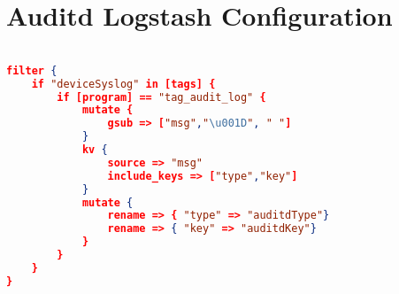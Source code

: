 
%
%

\section*{Auditd Logstash Configuration}
%
\label{appendix:auditdlogstashconfiguration}

\begin{lstlisting}[language=json,firstnumber=1]

filter {
    if "deviceSyslog" in [tags] {
        if [program] == "tag_audit_log" { 
            mutate {
                gsub => ["msg","\u001D", " "]
            }
            kv {
                source => "msg"
                include_keys => ["type","key"]
            }
            mutate {
                rename => { "type" => "auditdType"}
                rename => { "key" => "auditdKey"}
            }
        }
    }    
}

\end{lstlisting}

\pagebreak

